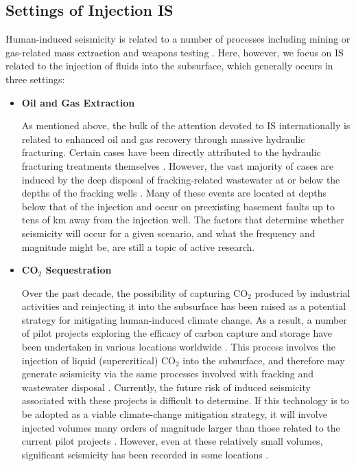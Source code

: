 \subsection{Settings of Injection IS}
Human-induced seismicity is related to a number of processes including mining or gas-related mass extraction and weapons testing \citep[e.g.][]{Chambers_2015,Kim_2007}. Here, however, we focus on IS related to the injection of fluids into the subsurface, which generally occurs in three settings:
\begin{itemize}
  \item{\textbf{Oil and Gas Extraction}}
  
  As mentioned above, the bulk of the attention devoted to IS internationally is related to enhanced oil and gas recovery through massive hydraulic fracturing. Certain cases have been directly attributed to the hydraulic fracturing treatments themselves \citep[e.g.][in Canada]{Atkinson_2016,Skoumal_2015}. However, the vast majority of cases are induced by the deep disposal of fracking-related wastewater at or below the depths of the fracking wells \citep[e.g.][]{Kim_2013,Keranen_2013,Yeck_2017,McGarr_2017}. Many of these events are located at depths below that of the injection and occur on preexisting basement faults up to tens of km away from the injection well. The factors that determine whether seismicity will occur for a given scenario, and what the frequency and magnitude might be, are still a topic of active research.

  \item{\textbf{CO$_{2}$ Sequestration}}
  
  Over the past decade, the possibility of capturing CO$_2$ produced by industrial activities and reinjecting it into the subsurface has been raised as a potential strategy for mitigating human-induced climate change. As a result, a number of pilot projects exploring the efficacy of carbon capture and storage have been undertaken in various locations worldwide \citep{Evans_2012,Zoback_2012co2}. This process involves the injection of liquid (supercritical) CO$_2$ into the subsurface, and therefore may generate seismicity via the same processes involved with fracking and wastewater disposal \citep{2013}. Currently, the future risk of induced seismicity associated with these projects is difficult to determine. If this technology is to be adopted as a viable climate-change mitigation strategy, it will involve injected volumes many orders of magnitude larger than those related to the current pilot projects \citep{Zoback_2012co2}. However, even at these relatively small volumes, significant seismicity has been recorded in some locations \citep[e.g.][]{Goertz_Allmann_2017}.
  

\end{itemize}
